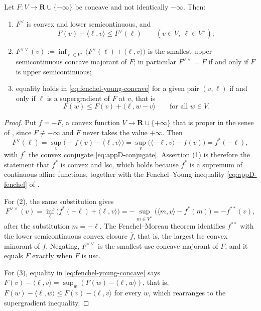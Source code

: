 \begin{proposition}
\label{prop:concave-biconjugation}
Let $F:V\to\mathbf R\cup\{-\infty\}$ be concave and not identically
$-\infty$.  Then:
\begin{enumerate}
\item $F^\vee$ is convex and lower semicontinuous, and
\begin{equation}
\label{eq:fenchel-young-concave}
 F(v)-\langle\ell,v\rangle\leq F^\vee(\ell)
 \qquad(v\in V,\ \ell\in V^\vee);
\end{equation}
\item $F^{\vee\vee}(v):=\inf_{\ell\in V^\vee}
  \bigl(F^\vee(\ell)+\langle\ell,v\rangle\bigr)$
  is the smallest upper semicontinuous concave majorant of $F$; in particular
  $F^{\vee\vee}=F$ if and only if $F$ is upper semicontinuous;
\item equality holds in \eqref{eq:fenchel-young-concave} for a given pair
  $(v,\ell)$ if and only if $\ell$ is a supergradient of $F$ at $v$, that is
\[
 F(w)\leq F(v)+\langle\ell,w-v\rangle\qquad\text{for all }w\in V .
\]
\end{enumerate}
\par
\end{proposition}

\begin{proof}
Put $f=-F$, a convex function $V\to\mathbf R\cup\{+\infty\}$ that is proper in
the sense of , since $F\not\equiv-\infty$ and $F$
never takes the value $+\infty$.  Then
\[
 F^\vee(\ell)=\sup_v\bigl(-f(v)-\langle\ell,v\rangle\bigr)
 =\sup_v\bigl(\langle-\ell,v\rangle-f(v)\bigr)=f^*(-\ell),
\]
with $f^*$ the convex conjugate \eqref{eq:appD-conjugate}.  Assertion (1) is
therefore the statement that $f^*$ is convex and lsc, which holds because
$f^*$ is a supremum of continuous affine functions, together with the
Fenchel--Young inequality \eqref{eq:appD-fenchel} of
.

For (2), the same substitution gives
\[
 F^{\vee\vee}(v)=\inf_\ell\bigl(f^*(-\ell)+\langle\ell,v\rangle\bigr)
 =-\sup_{m\in V^\vee}\bigl(\langle m,v\rangle-f^*(m)\bigr)
 =-f^{**}(v),
\]
after the substitution $m=-\ell$.  The Fenchel--Moreau theorem
 identifies $f^{**}$ with the lower
semicontinuous convex closure $\overline f$, that is, the largest lsc convex
minorant of $f$.  Negating, $F^{\vee\vee}$ is the smallest usc concave
majorant of $F$, and it equals $F$ exactly when $F$ is usc.

For (3), equality in \eqref{eq:fenchel-young-concave} says
$F(v)-\langle\ell,v\rangle=\sup_w(F(w)-\langle\ell,w\rangle)$, that is,
$F(w)-\langle\ell,w\rangle\leq F(v)-\langle\ell,v\rangle$ for every $w$, which
rearranges to the supergradient inequality.
\end{proof}

